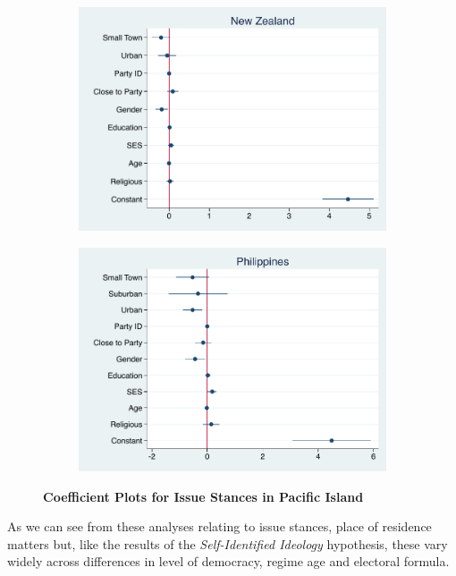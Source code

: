\documentclass[12pt, titlepage]{article}
\newcommand\e{\emph}
\newcommand\tb{\textbf}
\begin{document}
\begin{figure}[H]
	\centering
	\begin{subfigure}[b]{0.475\textwidth}
		\centering
		\includegraphics[width=\textwidth]{LibCoef/NZealand}
	\end{subfigure}
	\hfill
	\begin{subfigure}[b]{0.475\textwidth}  
		\centering 
		\includegraphics[width=\textwidth]{LibCoef/Philippines}
	\end{subfigure}
	\caption[ \tb{Issue Stances - Pacific Islands} ]
	{\tb {Coefficient Plots for Issue Stances in Pacific Island} }
	\label{PacificLibCoef}
\end{figure}

As we can see from these analyses relating to issue stances, place of residence matters but, like the results of the \e{Self-Identified Ideology} hypothesis, these vary widely across differences in level of democracy, regime age and electoral formula.
\end{document}
